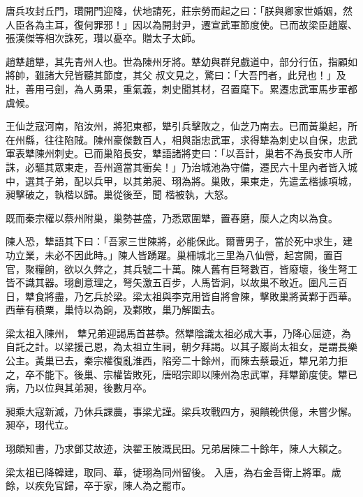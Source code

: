 \begin{pinyinscope}
 唐兵攻封丘門，瓚開門迎降，伏地請死，莊宗勞而起之曰：「朕與卿家世婚姻，然人臣各為主耳，復何罪邪！」因以為開封尹，遷宣武軍節度使。已而故梁臣趙巖、張漢傑等相次誅死，瓚以憂卒。贈太子太師。



 趙犨趙犨，其先青州人也。世為陳州牙將。犨幼與群兒戲道中，部分行伍，指顧如將帥，雖諸大兒皆聽其節度，其父
 叔文見之，驚曰：「大吾門者，此兒也！」及壯，善用弓劍，為人勇果，重氣義，刺史聞其材，召置麾下。累遷忠武軍馬步軍都虞候。



 王仙芝寇河南，陷汝州，將犯東都，犨引兵擊敗之，仙芝乃南去。已而黃巢起，所在州縣，往往陷賊。陳州豪傑數百人，相與詣忠武軍，求得犨為刺史以自保，忠武軍表犨陳州刺史。已而巢陷長安，犨語諸將吏曰：「以吾計，巢若不為長安市人所誅，必驅其眾東走，吾州適當其衝矣！」乃治城池為守備，遷民六十里內者皆入城中，選其子弟，配以兵甲，以其弟昶、珝為將。巢敗，果東走，先遣孟楷據項城，昶擊破之，執楷以歸。巢從後至，聞
 楷被執，大怒。



 既而秦宗權以蔡州附巢，巢勢甚盛，乃悉眾圍犨，置舂磨，糜人之肉以為食。



 陳人恐，犨語其下曰：「吾家三世陳將，必能保此。爾曹男子，當於死中求生，建功立業，未必不因此時。」陳人皆踴躍。巢柵城北三里為八仙營，起宮闕，置百官，聚糧餉，欲以久弊之，其兵號二十萬。陳人舊有巨弩數百，皆廢壞，後生弩工皆不識其器。珝創意理之，弩矢激五百步，人馬皆洞，以故巢不敢近。圍凡三百日，犨食將盡，乃乞兵於梁。梁太祖與李克用皆自將會陳，擊敗巢將黃鄴于西華。西華有積粟，巢恃以為餉，及鄴敗，巢乃解圍去。



 梁太祖入陳州，
 犨兄弟迎謁馬首甚恭。然犨陰識太祖必成大事，乃降心屈迹，為自託之計。以梁援己恩，為太祖立生祠，朝夕拜謁。以其子巖尚太祖女，是謂長樂公主。黃巢已去，秦宗權復亂淮西，陷旁二十餘州，而陳去蔡最近，犨兄弟力拒之，卒不能下。後巢、宗權皆敗死，唐昭宗即以陳州為忠武軍，拜犨節度使。犨已病，乃以位與其弟昶，後數月卒。



 昶乘大寇新滅，乃休兵課農，事梁尤謹。梁兵攻戰四方，昶饋輓供億，未嘗少懈。昶卒，珝代立。



 珝頗知書，乃求鄧艾故迹，決翟王陂溉民田。兄弟居陳二十餘年，陳人大賴之。



 梁太祖已降韓建，取同、華，徙珝為同州留後。
 入唐，為右金吾衛上將軍。歲餘，以疾免官歸，卒于家，陳人為之罷市。




\end{pinyinscope}
